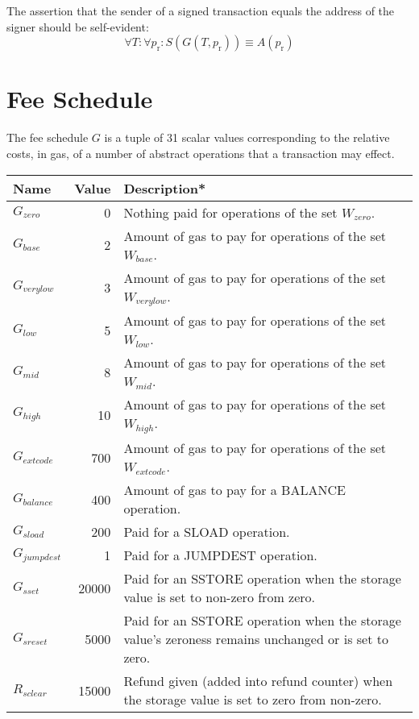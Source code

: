 \documentclass[9pt,oneside]{amsart}
\begin{document}
The assertion that the sender of a signed transaction equals the address of the signer should be self-evident:
\begin{equation}
\forall T: \forall p_{\mathrm{r}}: S(G(T, p_{\mathrm{r}})) \equiv A(p_{\mathrm{r}})
\end{equation}

\section{Fee Schedule}\label{app:fees}

The fee schedule $G$ is a tuple of 31 scalar values corresponding to the relative costs, in gas, of a number of abstract operations that a transaction may effect.

\begin{tabular*}{\columnwidth}[h]{lrl}
\toprule
Name & Value & Description* \\
\midrule
$G_{zero}$ & 0 & Nothing paid for operations of the set {\small $W_{zero}$}. \\
$G_{base}$ & 2 & Amount of gas to pay for operations of the set {\small $W_{base}$}. \\
$G_{verylow}$ & 3 & Amount of gas to pay for operations of the set {\small $W_{verylow}$}. \\
$G_{low}$ & 5 & Amount of gas to pay for operations of the set {\small $W_{low}$}. \\
$G_{mid}$ & 8 & Amount of gas to pay for operations of the set {\small $W_{mid}$}. \\
$G_{high}$ & 10 & Amount of gas to pay for operations of the set {\small $W_{high}$}. \\
$G_{extcode}$ & 700 & Amount of gas to pay for operations of the set {\small $W_{extcode}$}. \\
$G_{balance}$ & 400 & Amount of gas to pay for a {\small BALANCE} operation. \\
$G_{sload}$ & 200 & Paid for a {\small SLOAD} operation. \\
$G_{jumpdest}$ & 1 & Paid for a {\small JUMPDEST} operation. \\
$G_{sset}$ & 20000 & Paid for an {\small SSTORE} operation when the storage value is set to non-zero from zero. \\
$G_{sreset}$ & 5000 & Paid for an {\small SSTORE} operation when the storage value's zeroness remains unchanged or is set to zero. \\
$R_{sclear}$ & 15000 & Refund given (added into refund counter) when the storage value is set to zero from non-zero.

\end{tabular*}
\end{document}
